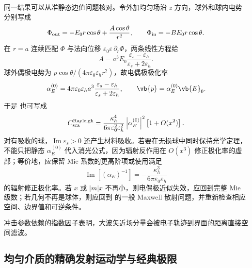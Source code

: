 \begin{exbox}
同一结果可以从准静态边值问题核对。令外加均匀场沿 $z$ 方向，球外和球内电势分别写成
\begin{equation*}
\Phi_{\rm out}
=-E_0r\cos\theta+\frac{A\cos\theta}{r^2},
\qquad
\Phi_{\rm in}=-BE_0r\cos\theta.
\end{equation*}
在 $r=a$ 连续匹配 $\Phi$ 与法向位移 $\varepsilon_0\varepsilon\,\partial_r\Phi$，两条线性方程给
\begin{equation*}
A=a^3E_0
\frac{\varepsilon_s-\varepsilon_h}
{\varepsilon_s+2\varepsilon_h}.
\end{equation*}
球外偶极电势为 $p\cos\theta/(4\pi\varepsilon_0\varepsilon_h r^2)$，故电偶极极化率
\begin{equation}
{
\alpha_E^{(0)}
=4\pi\varepsilon_0\varepsilon_h a^3
\frac{\varepsilon_s-\varepsilon_h}
{\varepsilon_s+2\varepsilon_h},
\qquad
\vb{p}=\alpha_E^{(0)}\vb{E}_0.}
\label{eq:rayleigh-static-polarizability-dp75}
\end{equation}
于是 也可写成
\begin{equation*}
C_{\rm sca}^{\rm Rayleigh}
=\frac{\kappa_h^4}
{6\pi\varepsilon_0^2\varepsilon_h^2}
\left|\alpha_E^{(0)}\right|^2
\left[1+O(x^2)\right].
\end{equation*}
对有吸收的球，$\operatorname{Im}\varepsilon_s>0$ 还产生材料吸收。若要在无损球中同时保持光学定理，不能只把静态 $\alpha_E^{(0)}$ 代入消光公式，因为辐射反作用在 $O(x^3)$ 修正极化率的虚部；等价地，应保留 Mie 系数的更高阶项或使用满足
\begin{equation*}
\operatorname{Im}\!\left[(\alpha_E)^{-1}\right]
=-\frac{\kappa_h^3}{6\pi\varepsilon_0\varepsilon_h}
\end{equation*}
的辐射修正极化率。若 $x$ 或 $|m|x$ 不再小，则电偶极近似失效，应回到完整 Mie 级数；若几何不再是球体，则应回到 的一般 Maxwell 散射问题，并重新检查相应空间、边界值和可逆条件。
\end{exbox}

冲击参数依赖的指数因子表明，大波矢近场分量会被电子轨迹到界面的距离直接空间滤波。

\subsection{均匀介质的精确发射运动学与经典极限}

